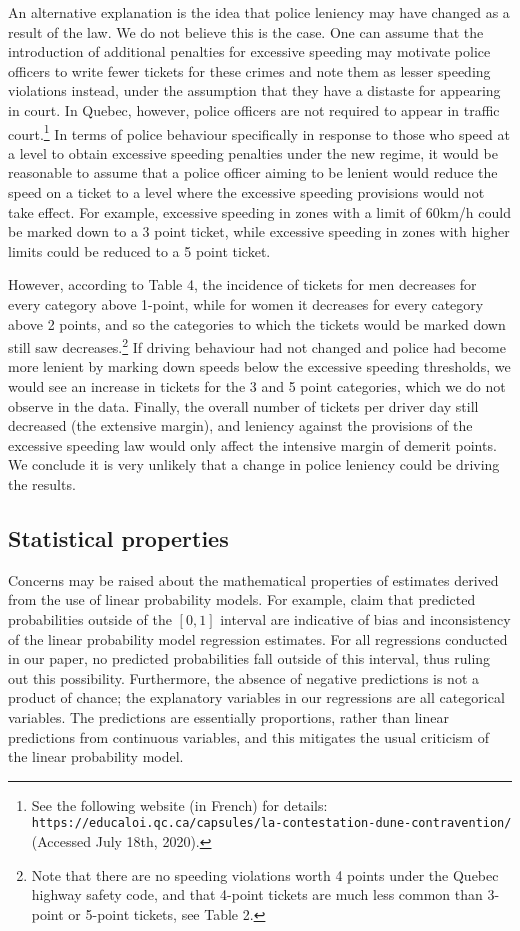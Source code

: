 An alternative explanation is the idea that police leniency may have changed as a result of the law. We do not believe this is the case. One can assume that the introduction of additional penalties for excessive speeding may motivate police officers to write fewer tickets for these crimes and note them as lesser speeding violations instead, under the assumption that they have a distaste for appearing in court. In Quebec, however, police officers are not required to appear in traffic court.\footnote{%
See the following website (in French) for details: \texttt{https://educaloi.qc.ca/capsules/la-contestation-dune-contravention/} (Accessed July 18th, 2020).}  
In terms of police behaviour specifically in response to those who speed at a level to obtain excessive speeding penalties under the new regime, it would be reasonable to assume that a police officer aiming to be lenient would reduce the speed on a ticket to a level where the excessive speeding provisions would not take effect. For example, excessive speeding in zones with a limit of 60km/h could be marked down to a 3 point ticket, while excessive speeding in zones with higher limits could be reduced to a 5 point ticket. 

However, according to Table 4, the incidence of tickets for men decreases for every category above 1-point, while for women it decreases for every category above 2 points, and so the categories to which the tickets would be marked down still saw decreases.\footnote{%
Note that there are no speeding violations worth 4 points under the Quebec highway safety code, and that 4-point tickets are much less common than 3-point or 5-point tickets, see Table 2.
}  
If driving behaviour had not changed and police had become more lenient by marking down speeds below the excessive speeding thresholds, we would see an increase in tickets for the 3 and 5 point categories, which we do not observe in the data. Finally, the overall number of tickets per driver day still decreased (the extensive margin), and leniency against the provisions of the excessive speeding law would only affect the intensive margin of demerit points. We conclude it is very unlikely that a change in police leniency could be driving the results.


\subsection{Statistical properties}

Concerns may be raised about the mathematical properties of estimates derived from the use of linear probability models. For example, 
\citet{horraceoaxaca2006}
claim that predicted probabilities outside of the $[0,1]$ interval are indicative of bias and inconsistency of the linear probability model regression estimates. For all regressions conducted in our paper, no predicted probabilities fall outside of this interval, thus ruling out this possibility. Furthermore, the absence of negative predictions is not a product of chance; the explanatory variables in our regressions are all categorical variables. The predictions are essentially proportions, rather than linear predictions from continuous variables, and this mitigates the usual criticism of the linear probability model. 

